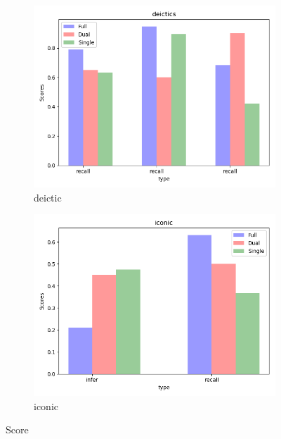 \documentclass[11pt]{article}
\begin{document}
\begin{figure}[H]
\begin{subfigure}[t]{0.5\textwidth}
        \includegraphics[scale=0.5]{deictics}
        \caption{deictic}
    \end{subfigure}%
    \begin{subfigure}[t]{0.5\textwidth}
        \centering
        \includegraphics[scale=0.5]{iconic}
        \caption{iconic}
    \end{subfigure}
    \caption{Score}
\end{figure}
\end{document}
